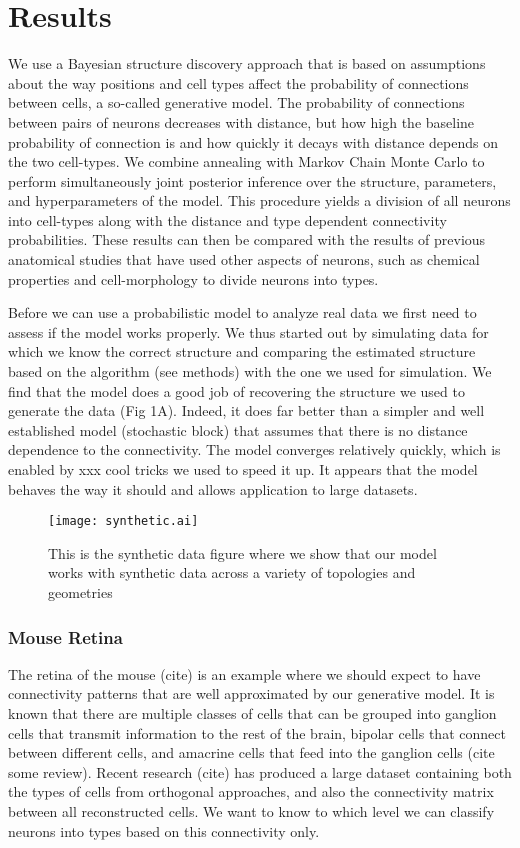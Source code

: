 \documentclass{nature}
\begin{document}
\section{Results}
We use a Bayesian structure discovery approach that is based on
assumptions about the way positions and cell types affect the
probability of connections between cells, a so-called generative
model. The probability of connections between pairs of neurons
decreases with distance, but how high the baseline probability of
connection is and how quickly it decays with distance depends on the
two cell-types. We combine annealing with Markov Chain Monte Carlo to
perform simultaneously joint posterior inference over the structure,
parameters, and hyperparameters of the model. This procedure yields a
division of all neurons into cell-types along with the distance and
type dependent connectivity probabilities. These results can then be
compared with the results of previous anatomical studies that have
used other aspects of neurons, such as chemical properties and
cell-morphology to divide neurons into types.

Before we can use a probabilistic model to analyze real data we first
need to assess if the model works properly. We thus started out by
simulating data for which we know the correct structure and comparing
the estimated structure based on the algorithm (see methods) with the
one we used for simulation. We find that the model does a good job of
recovering the structure we used to generate the data (Fig
1A). Indeed, it does far better than a simpler and well established
model (stochastic block) that assumes that there is no distance
dependence to the connectivity. The model converges relatively
quickly, which is enabled by xxx cool tricks we used to speed it
up. It appears that the model behaves the way it should and allows
application to large datasets.

\begin{figure}
  \centering 
  \centerline{\texttt{[image: synthetic.ai]}}
  \caption{This is the synthetic data figure where we show that our model works with synthetic data across a variety of topologies and geometries}
\end{figure}

\subsubsection{Mouse Retina}
The retina of the mouse (cite) is an example where we should expect to
have connectivity patterns that are well approximated by our
generative model. It is known that there are multiple classes of cells
that can be grouped into ganglion cells that transmit information to
the rest of the brain, bipolar cells that connect between different
cells, and amacrine cells that feed into the ganglion cells (cite some
review). Recent research (cite) has produced a large dataset
containing both the types of cells from orthogonal approaches, and
also the connectivity matrix between all reconstructed cells. We want
to know to which level we can classify neurons into types based on
this connectivity only.
\end{document}
